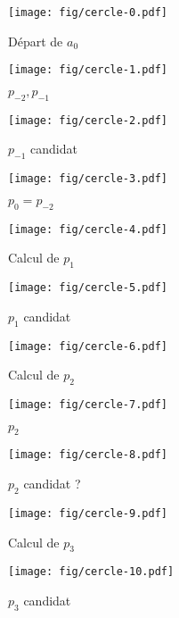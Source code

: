 \documentclass{beamer}
\begin{document}
\begin{frame}
\begin{columns}[t]
  \begin{column}{6cm}
{
  \begin{figure}[h!]
    \centering
    \texttt{[image: fig/cercle-0.pdf]}
    \caption{Départ de $a_{0}$}
\end{figure}
}
{
  \begin{figure}[h!]
    \centering
    \texttt{[image: fig/cercle-1.pdf]}
    \caption{$p_{-2}, p_{-1}$}
\end{figure}
}
{
  \begin{figure}[h!]
    \centering
    \texttt{[image: fig/cercle-2.pdf]}
    \caption{$p_{-1}$ candidat}
\end{figure}
}
{
  \begin{figure}[h!]
    \centering
    \texttt{[image: fig/cercle-3.pdf]}
    \caption{$p_{0} = p_{-2}$}
\end{figure}
}
{
  \begin{figure}[h!]
    \centering
    \texttt{[image: fig/cercle-4.pdf]}
    \caption{Calcul de $p_{1}$}
\end{figure}
}
{
  \begin{figure}[h!]
    \centering
    \texttt{[image: fig/cercle-5.pdf]}
    \caption{$p_{1}$ candidat}
\end{figure}
}
{
  \begin{figure}[h!]
    \centering
    \texttt{[image: fig/cercle-6.pdf]}
    \caption{Calcul de $p_{2}$}
\end{figure}
}
{
  \begin{figure}[h!]
    \centering
    \texttt{[image: fig/cercle-7.pdf]}
    \caption{$p_{2}$}
\end{figure}
}
{
  \begin{figure}[h!]
    \centering
    \texttt{[image: fig/cercle-8.pdf]}
    \caption{$p_{2}$ candidat ?}
\end{figure}
}
{
  \begin{figure}[h!]
    \centering
    \texttt{[image: fig/cercle-9.pdf]}
    \caption{Calcul de $p_{3}$}
\end{figure}
}
{
  \begin{figure}[h!]
    \centering
    \texttt{[image: fig/cercle-10.pdf]}
    \caption{$p_{3}$ candidat}
\end{figure}
}
{
  \begin{figure}[h!]
    \centering

\end{figure}}
\end{column}
\end{columns}
\end{frame}
\end{document}
